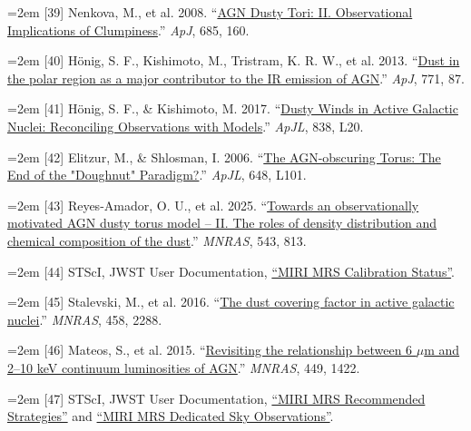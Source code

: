 \documentclass[12pt]{article}
\begin{document}
\noindent\hangindent=2em [39] Nenkova, M., et al. 2008. ``\href{https://arxiv.org/abs/0806.0512}{AGN Dusty Tori: II. Observational Implications of Clumpiness}.'' \emph{ApJ}, 685, 160.\par
\noindent\hangindent=2em [40] H\"onig, S. F., Kishimoto, M., Tristram, K. R. W., et al. 2013. ``\href{https://doi.org/10.1088/0004-637X/771/2/87}{Dust in the polar region as a major contributor to the IR emission of AGN}.'' \emph{ApJ}, 771, 87.\par
\noindent\hangindent=2em [41] H\"onig, S. F., \& Kishimoto, M. 2017. ``\href{https://doi.org/10.3847/2041-8213/aa6838}{Dusty Winds in Active Galactic Nuclei: Reconciling Observations with Models}.'' \emph{ApJL}, 838, L20.\par
\noindent\hangindent=2em [42] Elitzur, M., \& Shlosman, I. 2006. ``\href{https://doi.org/10.1086/508158}{The AGN-obscuring Torus: The End of the "Doughnut" Paradigm?}.'' \emph{ApJL}, 648, L101.\par
\noindent\hangindent=2em [43] Reyes-Amador, O. U., et al. 2025. ``\href{https://doi.org/10.1093/mnras/staf1494}{Towards an observationally motivated AGN dusty torus model -- II. The roles of density distribution and chemical composition of the dust}.'' \emph{MNRAS}, 543, 813.\par
\noindent\hangindent=2em [44] STScI, JWST User Documentation, \href{https://jwst-docs.stsci.edu/jwst-calibration-status/miri-calibration-status/miri-mrs-calibration-status}{``MIRI MRS Calibration Status''}.\par
\noindent\hangindent=2em [45] Stalevski, M., et al. 2016. ``\href{https://doi.org/10.1093/mnras/stw444}{The dust covering factor in active galactic nuclei}.'' \emph{MNRAS}, 458, 2288.\par
\noindent\hangindent=2em [46] Mateos, S., et al. 2015. ``\href{https://doi.org/10.1093/mnras/stv299}{Revisiting the relationship between 6 $\mu$m and 2--10 keV continuum luminosities of AGN}.'' \emph{MNRAS}, 449, 1422.\par
\noindent\hangindent=2em [47] STScI, JWST User Documentation, \href{https://jwst-docs.stsci.edu/jwst-mid-infrared-instrument/miri-observing-strategies/miri-mrs-recommended-strategies}{``MIRI MRS Recommended Strategies''} and \href{https://jwst-docs.stsci.edu/jwst-mid-infrared-instrument/miri-operations/miri-dithering/miri-mrs-dedicated-sky-observations}{``MIRI MRS Dedicated Sky Observations''}.\par
\end{document}
